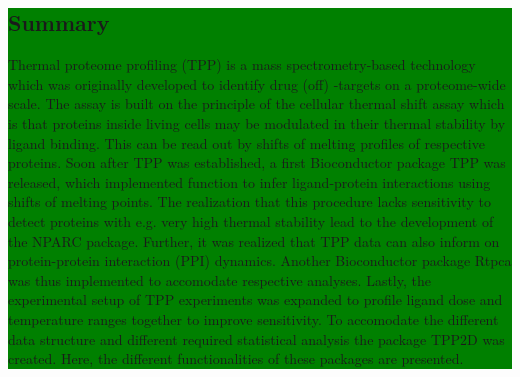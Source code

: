 \documentclass{article}
\newcommand{\hcode}[2][lgray]{{\ttfamily\color{vdgray}\colorbox{#1}{#2}}}
\begin{document}
\noindent
\colorbox{green}{
  \noindent
  \begin{minipage}[t]{\textwidth}
    \vspace{.15cm}
    \section*{\huge Summary}
    \large 
      Thermal proteome profiling (TPP) is a mass spectrometry-based 
      technology which was originally developed to identify drug (off)
      -targets on a proteome-wide scale. The assay is built on the principle
      of the cellular thermal shift assay which is that proteins inside living
      cells may be modulated in their thermal stability by ligand binding.
      This can be read out by shifts of melting profiles of respective proteins. 
      Soon after TPP was established, a first Bioconductor package \hcode{TPP} 
      was released, which implemented function to infer ligand-protein interactions
      using shifts of melting points. The realization that this procedure 
      lacks sensitivity to detect proteins with e.g. very high thermal stability lead 
      to the development of the \hcode{NPARC} package. 
      Further, it was realized that TPP data can also inform on protein-protein 
      interaction (PPI) dynamics. Another Bioconductor package \hcode{Rtpca} was thus implemented
      to accomodate respective analyses. 
      Lastly, the experimental setup of TPP experiments was expanded to profile ligand
      dose and temperature ranges together to improve sensitivity. To accomodate the 
      different data structure and different required statistical analysis the package
      \hcode{TPP2D} was created. Here, the different functionalities of these packages are presented. 
      
    \vspace{0.1cm}
  \end{minipage}
}
\vspace{-1cm}
\end{document}
